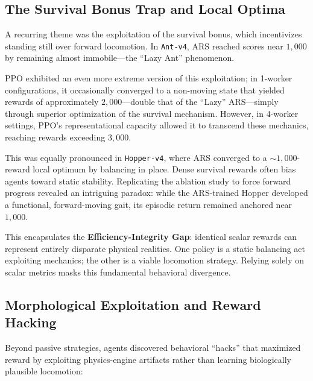 \subsection{The Survival Bonus Trap and Local Optima}
A recurring theme was the exploitation of the survival bonus, which incentivizes standing still over forward locomotion. In \texttt{Ant-v4}, ARS reached scores near $1,000$ by remaining almost immobile—the ``Lazy Ant'' phenomenon. 

PPO exhibited an even more extreme version of this exploitation; in 1-worker configurations, it occasionally converged to a non-moving state that yielded rewards of approximately $2,000$—double that of the ``Lazy'' ARS—simply through superior optimization of the survival mechanism. However, in 4-worker settings, PPO's representational capacity allowed it to transcend these mechanics, reaching rewards exceeding $3,000$.

This was equally pronounced in \texttt{Hopper-v4}, where ARS converged to a $\sim 1,000$-reward local optimum by balancing in place. Dense survival rewards often bias agents toward static stability. Replicating the ablation study to force forward progress revealed an intriguing paradox: while the ARS-trained Hopper developed a functional, forward-moving gait, its episodic return remained anchored near $1,000$. 

This encapsulates the \textbf{Efficiency-Integrity Gap}: identical scalar rewards can represent entirely disparate physical realities. One policy is a static balancing act exploiting mechanics; the other is a viable locomotion strategy. Relying solely on scalar metrics masks this fundamental behavioral divergence.

\subsection{Morphological Exploitation and Reward Hacking}
Beyond passive strategies, agents discovered behavioral ``hacks'' that maximized reward by exploiting physics-engine artifacts rather than learning biologically plausible locomotion:

